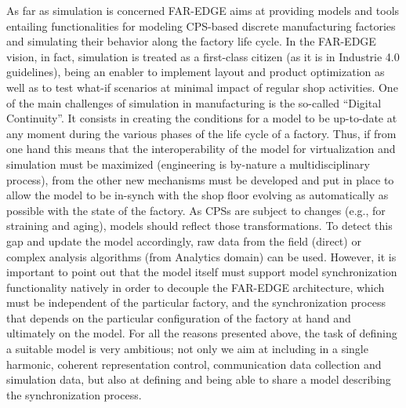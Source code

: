 As far as simulation is concerned FAR-EDGE aims at providing models and tools entailing functionalities for modeling CPS-based discrete manufacturing factories and simulating their behavior along the factory life cycle. 
In the FAR-EDGE vision, in fact, simulation is treated as a first-class citizen (as it is in Industrie 4.0 guidelines), being an enabler to implement layout and product optimization as well as to test what-if scenarios at minimal impact of regular shop activities. 
One of the main challenges of simulation in manufacturing is the so-called “Digital Continuity”. It consists in creating the conditions for a model to be up-to-date at any moment during the various phases of the life cycle of a factory. Thus, if from one hand this means that the interoperability of the model for virtualization and simulation must be maximized (engineering is by-nature a multidisciplinary process), from the other new mechanisms must be developed and put in place to allow the model to be in-synch with the shop floor evolving as automatically as possible with the state of the factory. As CPSs are subject to changes (e.g., for straining and aging), models should reflect those transformations. To detect this gap and update the model accordingly, raw data from the field (direct) or complex analysis algorithms (from Analytics domain) can be used. However, it is important to point out that the model itself must support model synchronization functionality natively in order to decouple the FAR-EDGE architecture, which must be independent of the particular factory, and the synchronization process that depends on the particular configuration of the factory at hand and ultimately on the model. 
For all the reasons presented above, the task of defining a suitable model is very ambitious; not only we aim at including in a single harmonic, coherent representation control, communication data collection and simulation data, but also at defining and being able to share a model describing the synchronization process.


